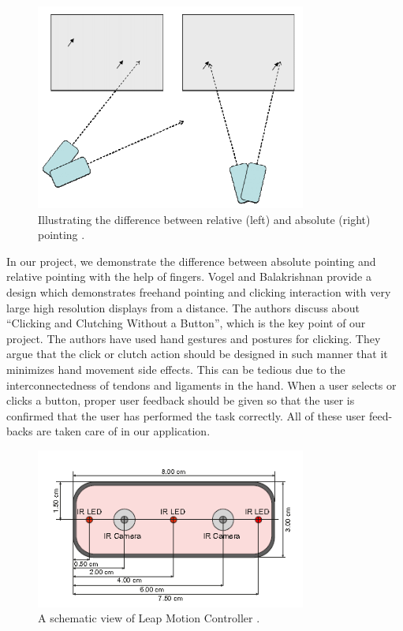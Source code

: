 \documentclass[titlepage]{article}
\begin{document}
\begin{figure}[!h]
\centering
\includegraphics[width=3.5in]{Figure_4}
\caption{Illustrating the difference between relative (left) and absolute (right) pointing \cite{2}.}
\end{figure}

In our project, we demonstrate the difference between absolute pointing and relative pointing with the help of fingers. Vogel and Balakrishnan \cite{3} provide a design which demonstrates freehand pointing and clicking interaction with very large high resolution displays from a distance. The authors discuss about “Clicking and Clutching Without a Button”, which is the key point of our project. The authors have used hand gestures and postures for clicking. They argue that the click or clutch action should be designed in such manner that it minimizes hand movement side effects. This can be tedious due to the interconnectedness of tendons and ligaments in the hand. When a user selects or clicks a button, proper user feedback should be given so that the user is confirmed that the user has performed the task correctly. All of these user feed-backs are taken care of in our application.

\begin{figure}[!h]
\centering
\includegraphics[width=3.5in]{Figure_5}
\caption{A schematic view of Leap Motion Controller \cite{4}.}
\end{figure}
\end{document}
